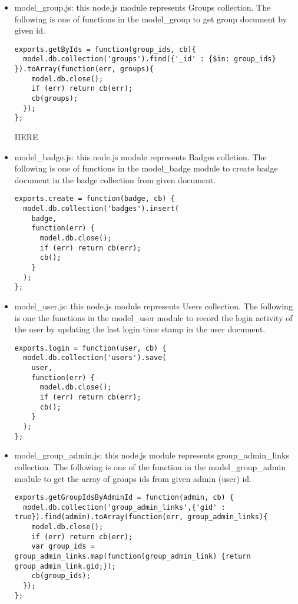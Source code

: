 \begin{itemize}
\item model{\_}group.js: this node.js module represents Groups collection. The following is one of functions in the model{\_}group to get group document by given id. 

\begin{lstlisting}
exports.getByIds = function(group_ids, cb){
  model.db.collection('groups').find({'_id' : {$in: group_ids} }).toArray(function(err, groups){
    model.db.close();
    if (err) return cb(err);
    cb(groups);
  });
};
\end{lstlisting}

HERE

\item model{\_}badge.js: this node.js module represents Badges colletion. The following is one of functions in the model{\_}badge module to create badge document in the badge collection from given document.  

\begin{lstlisting}
exports.create = function(badge, cb) {
  model.db.collection('badges').insert(
    badge,
    function(err) {
      model.db.close();
      if (err) return cb(err); 
      cb();
    }
  );  
};
\end{lstlisting}

\item model{\_}user.js: this node.js module represents Users collection. The following is one the functions in the model{\_}user module to record the login activity of the user by updating the last login time stamp in the user document.

\begin{lstlisting}
exports.login = function(user, cb) {
  model.db.collection('users').save(
    user,
    function(err) {
      model.db.close();
      if (err) return cb(err); 
      cb();
    }
  ); 
};
\end{lstlisting}

\item model{\_}group{\_}admin.js: this node.js module represents group{\_}admin{\_}links collection. The following is one of the function in the model{\_}group{\_}admin module to get the array of groups ids from given admin (user) id.

\begin{lstlisting}
exports.getGroupIdsByAdminId = function(admin, cb) {
  model.db.collection('group_admin_links',{'gid' : true}).find(admin).toArray(function(err, group_admin_links){
    model.db.close();
    if (err) return cb(err);
    var group_ids = group_admin_links.map(function(group_admin_link) {return group_admin_link.gid;});
    cb(group_ids);
  });    
};
\end{lstlisting}



\end{itemize}
